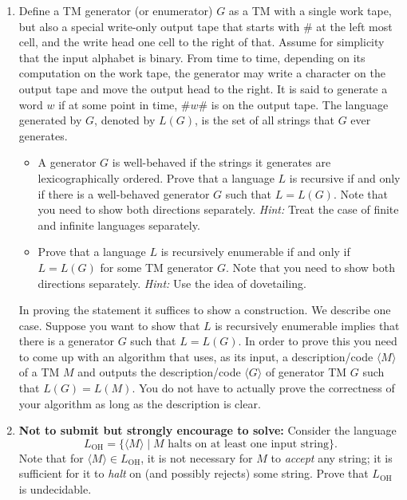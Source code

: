 \documentclass[11pt]{article}
\begin{document}
\begin{enumerate}
\item Define a TM generator (or enumerator) $G$ as a TM with a single
  work tape, but also a special write-only output tape that starts
  with $\#$ at the left most cell, and the write head one cell to the
  right of that.  Assume for simplicity that the input alphabet is
  binary.  From time to time, depending on its computation on the work
  tape, the generator may write a character on the output tape and
  move the output head to the right.  It is said to generate a word
  $w$ if at some point in time, $\#w\#$ is on the output tape. The
  language generated by $G$, denoted by $L(G)$, is the set of all
  strings that $G$ ever generates.
  \begin{itemize}
  \item A generator $G$ is well-behaved if the strings it generates
    are lexicographically ordered. Prove that a language $L$ is
    recursive if and only if there is a well-behaved generator $G$ such
    that $L=L(G)$. Note that you need
    to show both directions separately. {\em Hint:} Treat the case of finite and
    infinite languages separately.

  \item Prove that a language $L$ is recursively enumerable if and
    only if $L = L(G)$ for some TM generator $G$. Note that you need
    to show both directions separately. {\em Hint:} Use the idea of
    dovetailing.
  \end{itemize}
  In proving the statement it suffices to show a construction. We
  describe one case. Suppose you want to show that $L$ is recursively
  enumerable implies that there is a generator $G$ such that
  $L = L(G)$. In order to prove this you need to come up with an
  algorithm that uses, as its input, a description/code
  $\langle M \rangle$ of a TM $M$ and outputs the description/code
  $\langle G \rangle$ of generator TM $G$ such that $L(G) = L(M)$.  You
  do not have to actually prove the correctness of your algorithm as long as
  the description is clear.


\item {\bf Not to submit but strongly encourage to solve:} Consider the language $$L_{\text{OH}} = \{ \langle M\rangle
      \mid M \text{~halts on at least one input string}\}.$$ Note that
      for $\langle M\rangle \in L_{\text{OH}}$, it is not necessary
      for $M$ to {\em accept} any string; it is sufficient for it to
      {\em halt} on (and possibly rejects) some string. Prove that
      $L_{\text{OH}}$ is undecidable.

\end{enumerate}
\end{document}
